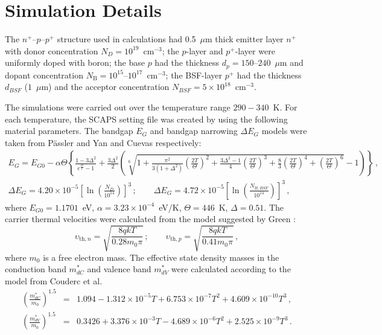 \documentclass[num-refs]{wiley-article} %
\begin{document}
\section{Simulation Details}

The $n^+$--$p$--$p^+$ structure used in calculations
had 0.5~$\mu$m thick emitter layer $n^+$ with donor concentration $N_D=10^{19}$~cm$^{-3}$;
the $p$-layer and $p^+$-layer were uniformly doped with boron;
the base $p$ had the thickness $d_p=150$--$240$~$\mu$m
and dopant concentration $N_\mathrm{B}=10^{15}$--$10^{17}$~cm$^{-3}$;
the BSF-layer $p^+$ had the thickness $d_{BSF}$ ($1$~$\mu$m)
and the acceptor concentration $N_{BSF}=5\times10^{18}$~cm$^{-3}$.

The simulations  were carried out over the temperature range $290-340$~K.
For each temperature, the SCAPS setting file was created
by using the following material parameters.
The bandgap $E_G$ and bandgap narrowing $\Delta E_G$ models were taken from
P\"{a}ssler \cite{Pasler} and Yan and Cuevas \cite{EgNarrow} respectively:
\begin{eqnarray}
\label{eqEg}
E_G=E_{G0}-\alpha\Theta\left\{\frac{1-3\Delta^2}{e^{\frac{\Theta}{T}}-1}
    +\frac{3\Delta^2}{2}\left(\sqrt[6]{1+\frac{\pi^2}{3(1+\Delta^2)}\left(\frac{2T}{\Theta}\right)^2
    +\frac{3\Delta^2-1}{4}\left(\frac{2T}{\Theta}\right)^3+\frac{8}{3}\left(\frac{2T}{\Theta}\right)^4
    +\left(\frac{2T}{\Theta}\right)^6}-1\right)\right\}\,,\\
\Delta E_G=4.20\times10^{-5}\left[\ln\left(\frac{N_{D}}{10^{14}}\right)\right]^3\,;\qquad
     \Delta E_G=4.72\times10^{-5}\left[\ln\left(\frac{N_{B,BSF}}{10^{14}}\right)\right]^3\,,
\end{eqnarray}
where
$E_{G0}=1.1701$~eV,
$\alpha=3.23\times10^{-4}$~eV/K,
$\Theta=446$~K,
$\Delta=0.51$.
The carrier thermal velocities were calculated from the model suggested by Green \citep{Nc:Green}:
\begin{equation}
\label{eqVth}
    \upsilon_{\mathrm{th},n}=\sqrt{\frac{8qkT}{0.28m_0\pi}}\,;\qquad
    \upsilon_{\mathrm{th},p}=\sqrt{\frac{8qkT}{0.41m_0\pi}}\,,
\end{equation}
where
$m_0$ is a free electron mass.
The effective state density masses in the conduction band $m^*_{dC}$ and
valence band $m^*_{dV}$ were calculated according to the model from Couderc et al. \citep{Si_ni_Couderc}
\begin{eqnarray}
  \left(\frac{m^*_{dC}}{m_0}\right)^{1.5} &=& 1.094-1.312\times10^{-5}T+6.753\times10^{-7}T^2+4.609\times10^{-10}T^3\,, \\
  \left(\frac{m^*_{dV}}{m_0}\right)^{1.5} &=& 0.3426+3.376\times10^{-3}T-4.689\times10^{-6}T^2+2.525\times10^{-9}T^3\,.
\end{eqnarray}
\end{document}
